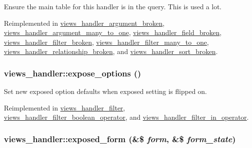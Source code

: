 Ensure the main table for this handler is in the query. This is used a lot. 

Reimplemented in \hyperlink{classviews__handler__argument__broken_479772a6b1f448d4edf3ff3eef988733}{views\_\-handler\_\-argument\_\-broken}, \hyperlink{classviews__handler__argument__many__to__one_f6195d516010fbd9cda241fa450a748a}{views\_\-handler\_\-argument\_\-many\_\-to\_\-one}, \hyperlink{classviews__handler__field__broken_887902026800149644e827fbb92dba15}{views\_\-handler\_\-field\_\-broken}, \hyperlink{classviews__handler__filter__broken_e85934ec4cf9e01aba2b17ce58ead155}{views\_\-handler\_\-filter\_\-broken}, \hyperlink{classviews__handler__filter__many__to__one_6ab5d3416cca7a6f5e59584071758673}{views\_\-handler\_\-filter\_\-many\_\-to\_\-one}, \hyperlink{classviews__handler__relationship__broken_cea2731924b5f5e3b83776f237b3ff67}{views\_\-handler\_\-relationship\_\-broken}, and \hyperlink{classviews__handler__sort__broken_148e3b71f7327ed44a139ecefbd1d43b}{views\_\-handler\_\-sort\_\-broken}.\hypertarget{classviews__handler_2db9f3127a5364b17fb775cede2f43a6}{
\subsubsection[{expose\_\-options}]{\setlength{\rightskip}{0pt plus 5cm}views\_\-handler::expose\_\-options ()}}
\label{classviews__handler_2db9f3127a5364b17fb775cede2f43a6}


Set new exposed option defaults when exposed setting is flipped on. 

Reimplemented in \hyperlink{classviews__handler__filter_07ab6afc47bf892fb5fd5934c3f1d64c}{views\_\-handler\_\-filter}, \hyperlink{classviews__handler__filter__boolean__operator_24ff1f565f02838bc2a63939ab510d89}{views\_\-handler\_\-filter\_\-boolean\_\-operator}, and \hyperlink{classviews__handler__filter__in__operator_0ed328117721ce41a3744f0339c16527}{views\_\-handler\_\-filter\_\-in\_\-operator}.\hypertarget{classviews__handler_657fbb873c6be9e1da904e2aad191f66}{
\subsubsection[{exposed\_\-form}]{\setlength{\rightskip}{0pt plus 5cm}views\_\-handler::exposed\_\-form (\&\$ {\em form}, \/  \&\$ {\em form\_\-state})}}
\label{classviews__handler_657fbb873c6be9e1da904e2aad191f66}


